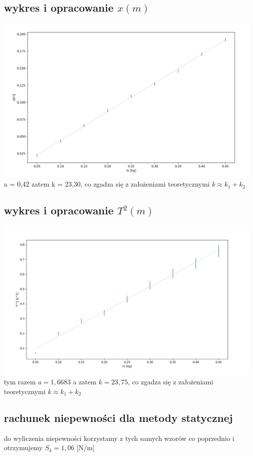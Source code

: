 \documentclass{article}
\begin{document}
\subsection{wykres i opracowanie $x(m)$}
\includegraphics[width=15cm]{m7_4a}
a = 0,42 zatem k = 23,30, co zgadza się z założeniami teoretycznymi $k\approx k_1 + k_2$ 

\subsection{wykres i opracowanie $T^2(m)$}
\includegraphics[width=15cm]{m7_4b}\\
tym razem $a=1,6683$ a zatem $k = 23,75$,  co zgadza się z założeniami teoretycznymi $k\approx k_1 + k_2$ 

\subsection{rachunek niepewności dla metody statycznej}
do wyliczenia niepewności korzystamy z tych samych wzorów co poprzednio i otrzymujemy
$S_k = 1,06$ [N/m]
\end{document}
